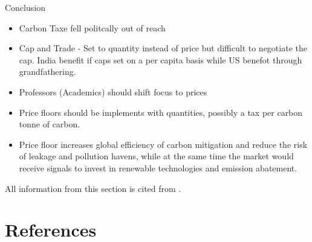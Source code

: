 \documentclass[12pt]{article}
\begin{document}
    Conclusion
    \begin{itemize}
        \item Carbon Taxe fell politcally out of reach
        \item Cap and Trade - Set to quantity instead of price but difficult to negotiate the cap. India benefit if caps set on a per capita basis while US benefot through grandfathering.
        \item Professors (Academics) should shift focus to prices
        \item Price floors should be implements with quantities, possibly a tax per carbon tonne of carbon. 
        \item Price floor increases global efficiency of carbon mitigation and reduce the risk of leakage and pollution havens, while at the same time the market would receive signals to invest in renewable technologies and emission abatement.
    \end{itemize}
    All information from this section is cited from \cite{A:3}.
\section{References}
\printbibliography
\end{document}
